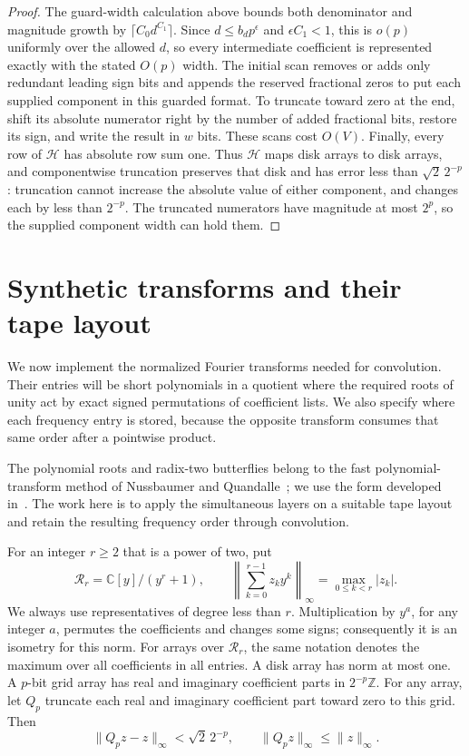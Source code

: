 \documentclass[11pt]{article}
\theoremstyle{definition}
\begin{document}
\begin{proof}
The guard-width calculation above bounds both denominator and magnitude
growth by $\lceil C_0d^{C_1}\rceil$. Since $d\le b_dp^\epsilon$ and
$\epsilon C_1<1$, this is $o(p)$ uniformly over the allowed $d$, so
every intermediate coefficient is represented exactly with
the stated $O(p)$ width. The initial scan removes or adds only
redundant leading sign bits and appends the reserved fractional zeros
to put each supplied component in this guarded format. To truncate
toward zero at the end, shift its absolute numerator right by the
number of added fractional bits, restore its sign, and write the
result in $w$ bits. These scans cost $O(V)$.
Finally, every row of $\mathcal H$ has
absolute row sum one. Thus $\mathcal H$ maps disk arrays to disk
arrays, and componentwise truncation preserves that disk and has
error less than $\sqrt2\,2^{-p}$: truncation cannot increase the
absolute value of either component, and changes each by less than
$2^{-p}$. The truncated numerators have magnitude at most $2^p$,
so the supplied component width can hold them.
\end{proof}
 \section{Synthetic transforms and their tape layout}
\label{sec:synthetic-layouts}

We now implement the normalized Fourier transforms needed for
convolution.  Their entries will be short polynomials in a quotient
where the required roots of unity act by exact signed permutations
of coefficient lists.  We also specify where each frequency entry
is stored, because the opposite transform consumes that same order
after a pointwise product.

The polynomial roots and radix-two butterflies belong to the fast
polynomial-transform method of Nussbaumer and
Quandalle~\cite{NussbaumerQuandalle1978,Nussbaumer1980}; we use the
form developed in~\cite[Section~2.4 and Lemma~3.2]{HarveyHoeven2021}.
The work here is to apply the simultaneous layers on a suitable tape
layout and retain the resulting frequency order through convolution.

For an integer $r\geq 2$ that is a power of two, put
\[
 \mathcal R_r=\mathbb C[y]/(y^r+1),\qquad
 \left\|\sum_{k=0}^{r-1}z_k y^k\right\|_\infty
       =\max_{0\leq k<r}|z_k|.
\]
We always use representatives of degree less than $r$.  Multiplication
by $y^a$, for any integer $a$, permutes the coefficients and changes
some signs; consequently it is an isometry for this norm.  For arrays
over $\mathcal R_r$, the same notation denotes the maximum over all
coefficients in all entries.  A disk array has norm at most one.  A
$p$-bit grid array has real and imaginary coefficient parts in
$2^{-p}\mathbb Z$.  For any array, let $Q_p$ truncate each real and
imaginary coefficient part toward zero to this grid.  Then
\begin{equation}
 \|Q_p z-z\|_\infty<\sqrt2\,2^{-p},\qquad
 \|Q_p z\|_\infty\leq\|z\|_\infty.
 \label{eq:transform-truncate}
\end{equation}
\end{document}
